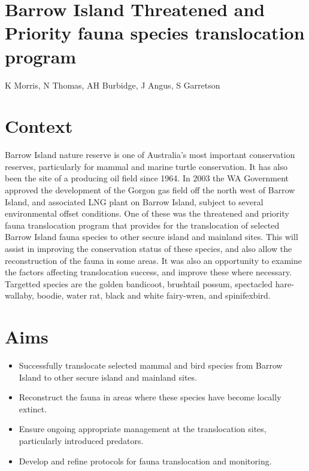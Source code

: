 \documentclass[version=last,
    paper=a4, %
    10pt, %
    usenames,
    dvipsnames,
    oneside, %
    headings=openany, %
    DIV=15 %
]{scrbook}
\begin{document}
\section*{Barrow Island Threatened and Priority fauna species translocation
program
}

K Morris, N Thomas, AH Burbidge, J Angus, S Garretson


\section*{Context}
Barrow Island nature reserve is one of Australia's most important
conservation reserves, particularly for mammal and marine turtle
conservation. It has also been the site of a producing oil field since
1964. In 2003 the WA Government approved the development of the Gorgon
gas field off the north west of Barrow Island, and associated LNG plant
on Barrow Island, subject to several environmental offset conditions.
One of these was the threatened and priority fauna translocation program
that provides for the translocation of selected Barrow Island fauna
species to other secure island and mainland sites. This will assist in
improving the conservation status of these species, and also allow the
reconstruction of the fauna in some areas. It was also an opportunity to
examine the factors affecting translocation success, and improve these
where necessary. Targetted species are the golden bandicoot, brushtail
possum, spectacled hare-wallaby, boodie, water rat, black and white
fairy-wren, and spinifexbird.



\section*{Aims}
\begin{itemize}
\itemsep1pt\parskip0pt
\item
  Successfully translocate selected mammal and bird species from Barrow
  Island to other secure island and mainland sites.
\item
  Reconstruct the fauna in areas where these species have become locally
  extinct.
\item
  Ensure ongoing appropriate management at the translocation sites,
  particularly introduced predators.
\item
  Develop and refine protocols for fauna translocation and monitoring.
\end{itemize}
\end{document}
